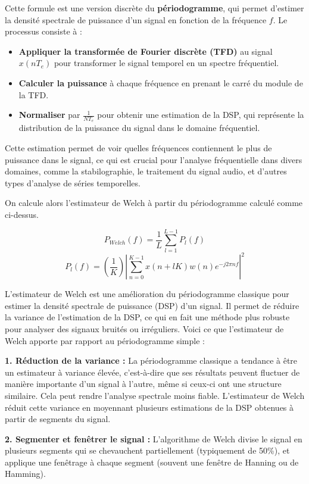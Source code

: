 Cette formule est une version discrète du \textbf{périodogramme}, qui permet d'estimer la densité spectrale de puissance d'un signal en fonction de la fréquence $f$. Le processus consiste à :
\begin{itemize}
    \item \textbf{Appliquer la transformée de Fourier discrète (TFD)} au signal $x(nT_e)$ pour transformer le signal temporel en un spectre fréquentiel.
    \item \textbf{Calculer la puissance} à chaque fréquence en prenant le carré du module de la TFD.
    \item \textbf{Normaliser} par $\frac{1}{N T_e}$ pour obtenir une estimation de la DSP, qui représente la distribution de la puissance du signal dans le domaine fréquentiel.
\end{itemize}

Cette estimation permet de voir quelles fréquences contiennent le plus de puissance dans le signal, ce qui est crucial pour l'analyse fréquentielle dans divers domaines, comme la stabilographie, le traitement du signal audio, et d'autres types d'analyse de séries temporelles.

On calcule alors l’estimateur de Welch à partir du périodogramme calculé comme ci-dessus.

\[
P_{Welch}(f) = \frac{1}{L} \sum_{l=1}^{L-1}P_l(f) \tag{18}
\]
\[
P_l(f) = \left( \frac{1}{K}\right) \left |\sum_{n=0}^{K-1} x(n+lK) w(n) e^{-j2\pi nf} \right |^2 \tag{19}
\]

L'estimateur de Welch est une amélioration du périodogramme classique pour estimer la densité spectrale de puissance (DSP) d'un signal. 
Il permet de réduire la variance de l'estimation de la DSP, ce qui en fait une méthode plus robuste pour analyser des signaux bruités ou irréguliers. 
Voici ce que l'estimateur de Welch apporte par rapport au périodogramme simple :

\textbf{1. Réduction de la variance :}
La périodogramme classique a tendance à être un estimateur à variance élevée, c'est-à-dire que ses résultats peuvent fluctuer de manière importante d'un signal à l'autre, même si ceux-ci ont une structure similaire. 
Cela peut rendre l'analyse spectrale moins fiable. 
L'estimateur de Welch réduit cette variance en moyennant plusieurs estimations de la DSP obtenues à partir de segments du signal.

\textbf{2. Segmenter et fenêtrer le signal :}
L'algorithme de Welch divise le signal en plusieurs segments qui se chevauchent partiellement (typiquement de 50\%), et applique une fenêtrage à chaque segment (souvent une fenêtre de Hanning ou de Hamming). 

